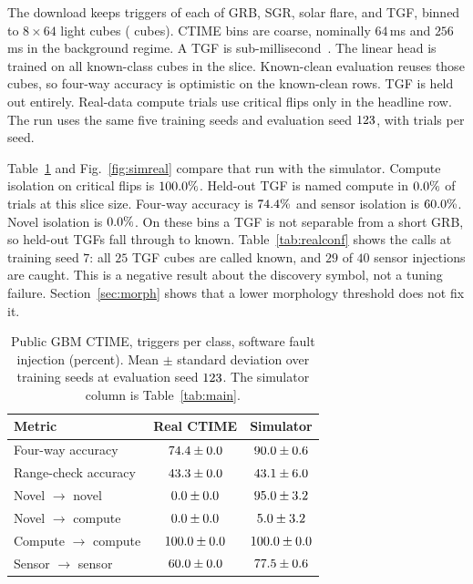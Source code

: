 \documentclass[preprint,12pt]{elsarticle}
\begin{document}
The download keeps \RealPerClass{} triggers of each of GRB, SGR, solar flare, and TGF, binned to $8\times 64$ light cubes (\RealCubes{} cubes). CTIME bins are coarse, nominally $64$\,ms and $256$\,ms in the background regime. A TGF is sub-millisecond~\cite{briggs2013,roberts2018}. The linear head is trained on all known-class cubes in the slice. Known-clean evaluation reuses those cubes, so four-way accuracy is optimistic on the known-clean rows. TGF is held out entirely. Real-data compute trials use critical flips only in the headline row. The run uses the same five training seeds and evaluation seed $123$, with \RealTrials{} trials per seed.

Table~\ref{tab:real} and Fig.~\ref{fig:simreal} compare that run with the simulator. Compute isolation on critical flips is $100.0\%$. Held-out TGF is named compute in $0.0\%$ of trials at this slice size. Four-way accuracy is $74.4\%$ and sensor isolation is $60.0\%$. Novel isolation is $0.0\%$. On these bins a TGF is not separable from a short GRB, so held-out TGFs fall through to known. Table~\ref{tab:realconf} shows the calls at training seed $7$: all $25$ TGF cubes are called known, and $29$ of $40$ sensor injections are caught. This is a negative result about the discovery symbol, not a tuning failure. Section~\ref{sec:morph} shows that a lower morphology threshold does not fix it.

\begin{table}[t]
\caption{Public GBM CTIME, \RealPerClass{} triggers per class, software fault injection (percent). Mean $\pm$ standard deviation over \RealSeeds{} training seeds at evaluation seed $123$. The simulator column is Table~\ref{tab:main}.}
\label{tab:real}
\centering
\begin{tabular}{lcc}
\toprule
Metric & Real CTIME & Simulator \\
\midrule
Four-way accuracy & $74.4\pm0.0$ & $90.0\pm0.6$ \\
Range-check accuracy & $43.3\pm0.0$ & $43.1\pm6.0$ \\
Novel $\to$ novel & $0.0\pm0.0$ & $95.0\pm3.2$ \\
Novel $\to$ compute & $0.0\pm0.0$ & $5.0\pm3.2$ \\
Compute $\to$ compute & $100.0\pm0.0$ & $100.0\pm0.0$ \\
Sensor $\to$ sensor & $60.0\pm0.0$ & $77.5\pm0.6$ \\
\bottomrule
\end{tabular}
\end{table}
\end{document}
